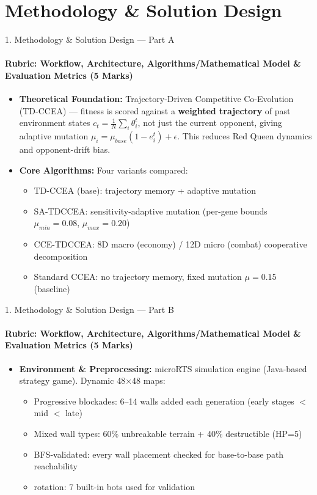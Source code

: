 \documentclass[aspectratio=169, 11pt]{beamer}
\begin{document}
\section{Methodology \& Solution Design}
\begin{frame}{1. Methodology \& Solution Design --- Part A}
    \framesubtitle{Rubric: Workflow, Architecture, Algorithms/Mathematical Model \& Evaluation Metrics (5 Marks)}
    
    \begin{itemize}
        \item \textbf{Theoretical Foundation:} Trajectory-Driven Competitive Co-Evolution (TD-CCEA) --- fitness is scored against a \textbf{weighted trajectory} of past environment states $c_t=\frac{1}{N}\sum_i\theta_i^t$, not just the current opponent, giving adaptive mutation $\mu_i = \mu_{base}(1-e_i^t)+\epsilon$. This reduces Red Queen dynamics and opponent-drift bias.
        
        \item \textbf{Core Algorithms:} Four variants compared:
        \begin{itemize}
            \item TD-CCEA (base): trajectory memory + adaptive mutation
            \item SA-TDCCEA: sensitivity-adaptive mutation (per-gene bounds $\mu_{min}{=}0.08$, $\mu_{max}{=}0.20$)
            \item CCE-TDCCEA: 8D macro (economy) / 12D micro (combat) cooperative decomposition
            \item Standard CCEA: no trajectory memory, fixed mutation $\mu{=}0.15$ (baseline)
        \end{itemize}
        
        
    \end{itemize}
\end{frame}
 
\begin{frame}{1. Methodology \& Solution Design --- Part B}
    \framesubtitle{Rubric: Workflow, Architecture, Algorithms/Mathematical Model \& Evaluation Metrics (5 Marks)}
    
    \begin{itemize}
        
        
        \item \textbf{Environment \& Preprocessing:} microRTS simulation engine (Java-based strategy game). Dynamic 48$\times$48 maps:
        \begin{itemize}
            \item Progressive blockades: 6--14 walls added each generation (early stages $<$ mid $<$ late)
            \item Mixed wall types: 60\% unbreakable terrain + 40\% destructible (HP=5)
            \item BFS-validated: every wall placement checked for base-to-base path reachability
            \item \Opponent rotation: 7 built-in bots used for validation 
        \end{itemize}
    \end{itemize}
\end{frame}
 
\end{document}
